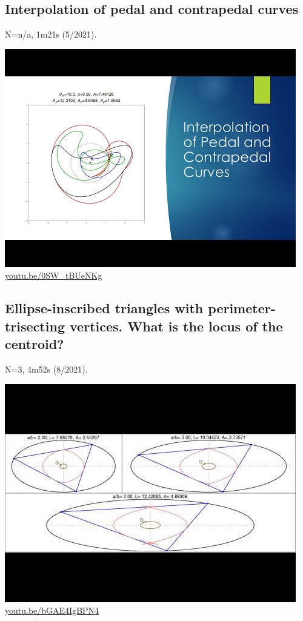 \documentclass[12pt]{amsart}
\begin{document}
\subsection{Interpolation of pedal and contrapedal curves}
\label{vid:0SW_tBUeNKg}
\noindent N=n/a, 1m21s (5/2021). 
\begin{center}\includegraphics[width=.5\textwidth]{pics/0SW_tBUeNKg.jpg} \\ 
\href{https://youtu.be/0SW_tBUeNKg}{\url{youtu.be/0SW\_tBUeNKg}}\end{center}
% 

\subsection{Ellipse-inscribed triangles with perimeter-trisecting vertices. What is the locus of the centroid?}
\label{vid:bGAE4IgBPN4}
\noindent N=3, 4m52s (8/2021). 
\begin{center}\includegraphics[width=.5\textwidth]{pics/bGAE4IgBPN4.jpg} \\ 
\href{https://youtu.be/bGAE4IgBPN4}{\url{youtu.be/bGAE4IgBPN4}}\end{center}
% 
\end{document}

